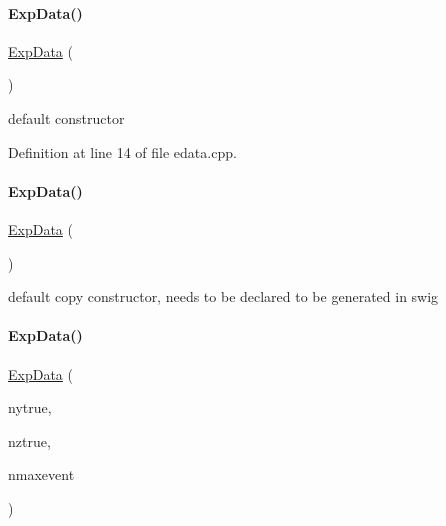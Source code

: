 \paragraph{\texorpdfstring{ExpData()}{ExpData()}\hspace{0.1cm}{\footnotesize\ttfamily [1/9]}}
{\footnotesize\ttfamily \mbox{\hyperlink{classamici_1_1_exp_data}{Exp\+Data}} (\begin{DoxyParamCaption}{ }\end{DoxyParamCaption})}

default constructor 

Definition at line 14 of file edata.\+cpp.

\mbox{\label{classamici_1_1_exp_data_a74a4a08956d260ee4a1b8f701564496d}} 
\paragraph{\texorpdfstring{ExpData()}{ExpData()}\hspace{0.1cm}{\footnotesize\ttfamily [2/9]}}
{\footnotesize\ttfamily \mbox{\hyperlink{classamici_1_1_exp_data}{Exp\+Data}} (\begin{DoxyParamCaption}\item[{const \mbox{\hyperlink{classamici_1_1_exp_data}{Exp\+Data}} \&}]{ }\end{DoxyParamCaption})\hspace{0.3cm}{\ttfamily [default]}}

default copy constructor, needs to be declared to be generated in swig \mbox{\label{classamici_1_1_exp_data_af2322d528ad31a4335b0e5178b373649}} 
\paragraph{\texorpdfstring{ExpData()}{ExpData()}\hspace{0.1cm}{\footnotesize\ttfamily [3/9]}}
{\footnotesize\ttfamily \mbox{\hyperlink{classamici_1_1_exp_data}{Exp\+Data}} (\begin{DoxyParamCaption}\item[{int}]{nytrue,  }\item[{int}]{nztrue,  }\item[{int}]{nmaxevent }\end{DoxyParamCaption})}

